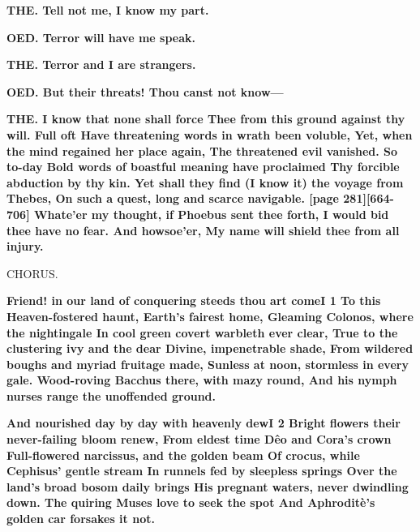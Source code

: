 \documentclass[11pt,letter]{book}
\begin{document}
\par \textbf{THE. Tell not me, I know my part.}
\par 

\par \textbf{OED. Terror will have me speak.}
\par 

\par \textbf{THE. Terror and I are strangers.}
\par 

\par \textbf{OED. But their threats! Thou canst not know—}
\par 

\par \textbf{THE. I know that none shall force Thee from this ground against thy will. Full oft Have threatening words in wrath been voluble, Yet, when the mind regained her place again, The threatened evil vanished. So to-day Bold words of boastful meaning have proclaimed Thy forcible abduction by thy kin. Yet shall they find (I know it) the voyage from Thebes, On such a quest, long and scarce navigable. [page 281][664-706] Whate’er my thought, if Phoebus sent thee forth, I would bid thee have no fear. And howsoe’er, My name will shield thee from all injury.}
\par 

\par  CHORUS.

\par \textbf{Friend! in our land of conquering steeds thou art comeI 1 To this Heaven-fostered haunt, Earth’s fairest home, Gleaming Colonos, where the nightingale In cool green covert warbleth ever clear, True to the clustering ivy and the dear Divine, impenetrable shade, From wildered boughs and myriad fruitage made, Sunless at noon, stormless in every gale. Wood-roving Bacchus there, with mazy round, And his nymph nurses range the unoffended ground.}
\par 

\par \textbf{And nourished day by day with heavenly dewI 2 Bright flowers their never-failing bloom renew, From eldest time Dêo and Cora’s crown Full-flowered narcissus, and the golden beam Of crocus, while Cephisus’ gentle stream In runnels fed by sleepless springs Over the land’s broad bosom daily brings His pregnant waters, never dwindling down. The quiring Muses love to seek the spot And Aphroditè’s golden car forsakes it not.}
\par 
\end{document}
